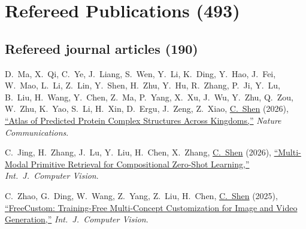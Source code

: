 \documentclass[9pt, a4paper]{article}
\newcommand{\years}[1]{\marginnote{\scriptsize #1}}
\def\highlight{\uline}
\begin{document}
\section*{Refereed Publications (493)}

\subsection*{Refereed journal articles (190)}
\years{2026} \noindent D.~Ma, X.~Qi, C.~Ye, J.~Liang, S.~Wen, Y.~Li, K.~Ding, Y.~Hao, J.~Fei, W.~Mao, L.~Li, Z.~Lin, Y.~Shen, H.~Zhu, Y.~Hu, R.~Zhang, P.~Ji, Y.~Lu, B.~Liu, H.~Wang, Y.~Chen, Z.~Ma, P.~Yang, X.~Xu, J.~Wu, Y.~Zhu, Q.~Zou, W.~Zhu, K.~Yao, S.~Li, H.~Xin, D.~Ergu, J.~Zeng, Z.~Xiao, \highlight{C.~Shen} (2026),
\href{http://www.google.com/search?lr=&ie=UTF-8&oe=UTF-8&q=Atlas+of+Predicted+Protein+Complex+Structures+Across+Kingdoms+Dacheng+Ma%2C+Xianzhi+Qi%2C+Cheng+Ye%2C+Jianqiang+Liang%2C+Shimin+Wen%2C+Yuanyuan+Li%2C+Kai+Ding%2C+Yongfu+Hao%2C+Junjie+Fei%2C+Weian+Mao%2C+Liupeng+Li%2C+Zhiyu+Lin%2C+Yichong+Shen%2C+Hongjie+Zhu%2C+Yayun+Hu%2C+Rui+Zhang%2C+Pengli+Ji%2C+Yafei+Lu%2C+Bonan+Liu%2C+Han+Wang%2C+Yuxuan+Chen%2C+Zhenguo+Ma%2C+Peiyuan+Yang%2C+Xinyu+Xu%2C+Junlong+Wu%2C+Youyuan+Zhu%2C+Qiaosha+Zou%2C+Wencheng+Zhu%2C+Kelu+Yao%2C+Shuya+Li%2C+Hongyi+Xin%2C+Daji+Ergu%2C+Jianyang+Zeng%2C+Zhi-Xiong+Xiao%2C+Chunhua+Shen}{``Atlas of Predicted Protein Complex Structures Across Kingdoms,{}''}
\emph{Nature Communications}.

\medskip

\years{2026} C.~Jing, H.~Zhang, J.~Lu, Y.~Liu, H.~Chen, X.~Zhang, \highlight{C.~Shen} (2026),
\href{http://www.google.com/search?lr=&ie=UTF-8&oe=UTF-8&q=Multi-Modal+Primitive+Retrieval+for+Compositional+Zero-Shot+Learning+Chenchen+Jing%2C+Haozhe+Zhang%2C+Junbo+Lu%2C+Yang+Liu%2C+Hao+Chen%2C+Xiaoqin+Zhang%2C+Chunhua+Shen}{``Multi-Modal Primitive Retrieval for Compositional Zero-Shot Learning,{}''}
\emph{Int.\ J.\  Computer Vision}.

\medskip

\years{2025} C.~Zhao, G.~Ding, W.~Wang, Z.~Yang, Z.~Liu, H.~Chen, \highlight{C.~Shen} (2025),
\href{http://www.google.com/search?lr=&ie=UTF-8&oe=UTF-8&q=FreeCustom%3A+Training-Free+Multi-Concept+Customization+for+Image+and+Video+Generation+Canyu+Zhao%2C+Ganggui+Ding%2C+Wen+Wang%2C+Zhen+Yang%2C+Zide+Liu%2C+Hao+Chen%2C+Chunhua+Shen}{``{FreeCustom}: Training-Free Multi-Concept Customization for Image and Video Generation,{}''}
\emph{Int.\ J.\  Computer Vision}.
\end{document}
